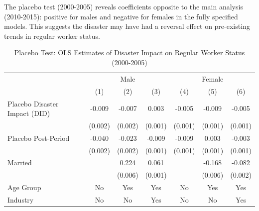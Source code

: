 \documentclass[serif, aspectratio=169]{beamer}
\begin{document}
\begin{frame}


The placebo test (2000-2005) reveals coefficients opposite to the main analysis (2010-2015): positive for males and negative for females in the fully specified models. This suggests the disaster may have had a reversal effect on pre-existing trends in regular worker status.


\begin{table}[htbp]
\centering

\caption{Placebo Test: OLS Estimates of Disaster Impact on Regular Worker Status (2000-2005)}

\vspace{-0.2cm}


\begin{tabular}{@{}l*{6}{c}@{}}
          &\multicolumn{3}{c}{Male}                                &\multicolumn{3}{c}{Female}                              \\\cmidrule(lr){2-4}\cmidrule(lr){5-7}
          &\multicolumn{1}{c}{(1)}         &\multicolumn{1}{c}{(2)}         &\multicolumn{1}{c}{(3)}         &\multicolumn{1}{c}{(4)}         &\multicolumn{1}{c}{(5)}         &\multicolumn{1}{c}{(6)}         \\
\toprule
Placebo Disaster Impact (DID)&   -0.009\sym{***}&   -0.007\sym{***}&    0.003\sym{***}&   -0.005\sym{***}&   -0.009\sym{***}&   -0.005\sym{***}\\
          &  (0.002)         &  (0.002)         &  (0.001)         &  (0.001)         &  (0.001)         &  (0.001)         \\
\addlinespace
Placebo Post-Period&   -0.040\sym{***}&   -0.023\sym{***}&   -0.009\sym{***}&   -0.009\sym{***}&    0.003\sym{**} &   -0.003\sym{***}\\
          &  (0.002)         &  (0.002)         &  (0.001)         &  (0.001)         &  (0.001)         &  (0.001)         \\
\addlinespace
Married   &                  &    0.224\sym{***}&    0.061\sym{***}&                  &   -0.168\sym{***}&   -0.082\sym{***}\\
          &                  &  (0.006)         &  (0.001)         &                  &  (0.006)         &  (0.002)         \\
\midrule
Age Group   &       No         &      Yes         &      Yes         &       No         &      Yes         &      Yes         \\
Industry  &       No         &       No         &      Yes         &       No         &       No         &      Yes         \\

\end{tabular}
\end{table}
\end{frame}
\end{document}
